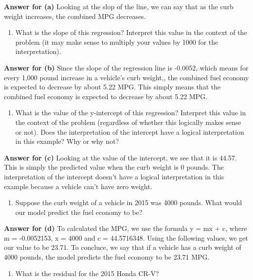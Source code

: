 \documentclass[
]{article}
\providecommand{\tightlist}{%
  \setlength{\itemsep}{0pt}\setlength{\parskip}{0pt}}
\begin{document}
\textbf{Answer for (a)} Looking at the slop of the line, we can say that
as the curb weight increases, the combined MPG decreases.

\begin{enumerate}
\def\labelenumi{(\alph{enumi})}
\setcounter{enumi}{1}
\tightlist
\item
  What is the slope of this regression? Interpret this value in the
  context of the problem (it may make sense to multiply your values by
  1000 for the interpretation).
\end{enumerate}

\textbf{Answer for (b)} Since the slope of the regression line is
-0.0052, which means for every 1,000 pound increase in a vehicle's curb
weight,, the combined fuel economy is expected to decrease by about 5.22
MPG. This simply means that the combined fuel economy is expected to
decrease by about 5.22 MPG.

\begin{enumerate}
\def\labelenumi{(\alph{enumi})}
\setcounter{enumi}{2}
\tightlist
\item
  What is the value of the y-intercept of this regression? Interpret
  this value in the context of the problem (regardless of whether this
  logically makes sense or not). Does the interpretation of the
  intercept have a logical interpretation in this example? Why or why
  not?
\end{enumerate}

\textbf{Answer for (c)} Looking at the value of the intercept, we see
that it is 44.57. This is simply the predicted value when the curb
weight is 0 pounds. The interpretation of the intercept doesn't have a
logical interpretation in this example because a vehicle can't have zero
weight.

\begin{enumerate}
\def\labelenumi{(\alph{enumi})}
\setcounter{enumi}{3}
\tightlist
\item
  Suppose the curb weight of a vehicle in 2015 was 4000 pounds. What
  would our model predict the fuel economy to be?
\end{enumerate}

\textbf{Answer for (d)} To calculated the MPG, we use the formula y = mx
+ c, where m = -0.0052153, x = 4000 and c = 44.5716348. Using the
following values, we get our value to be 23.71. To concluce, we say that
if a vehicle has a curb weight of 4000 pounds, the model predicts the
fuel economy to be 23.71 MPG.

\begin{enumerate}
\def\labelenumi{(\alph{enumi})}
\setcounter{enumi}{4}
\tightlist
\item
  What is the residual for the 2015 Honda CR-V?
\end{enumerate}
\end{document}
